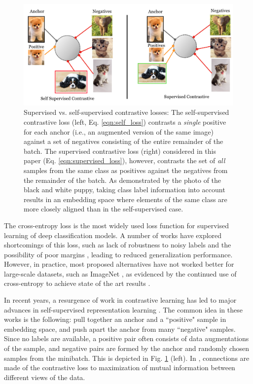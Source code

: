 \begin{figure}[t!]  
 \includegraphics[width=\linewidth]{./figs/teaser_fig_new1}
 {\caption{\small Supervised vs. self-supervised contrastive losses: The self-supervised contrastive loss (left, Eq. \ref{eqn:self_loss}) contrasts a \emph{single} positive for each anchor (i.e., an augmented version of the same image) against a set of negatives consisting of the entire remainder of the batch. The supervised contrastive loss (right) considered in this paper (Eq. \ref{eqn:supervised_loss}), however, contrasts the set of \emph{all} samples from the same class as positives against the negatives from the remainder of the batch. As demonstrated by the photo of the black and white puppy, taking class label information into account results in an embedding space where elements of the same class are more closely aligned than in the self-supervised case.}  
 \label{fig:teaser1}
}
 \vspace{-20pt}
\end{figure}

The cross-entropy loss is the most widely used loss function for supervised learning of deep classification models. A number of works have explored shortcomings of this loss, such as lack of robustness to noisy labels \cite{zhang2018generalized,sukhbaatar2014training} and the possibility of poor margins \cite{elsayed2018large,liu2016large}, leading to reduced generalization performance. However, in practice, most proposed alternatives have not worked better for large-scale datasets, such as ImageNet \cite{deng2009imagenet}, as evidenced by the continued use of cross-entropy to achieve state of the art results \cite{cubuk2019autoaugment,cubuk2019randaugment,xie2019self,kolesnikov2019large}. 


In recent years, a resurgence of work in contrastive learning has led to major advances in self-supervised representation learning \cite{wu2018unsupervised,henaff2019data,oord2018representation,tian2019contrastive,hjelm2018learning,chen2020simple,he2019momentum}. The common idea in these works is the following: pull together an anchor and a ``positive" sample in embedding space, and push apart the anchor from many ``negative" samples. Since no labels are available, a positive pair often consists of data augmentations of the sample, and negative pairs are formed by the anchor and randomly chosen samples from the minibatch. This is depicted in Fig. \ref{fig:teaser1} (left). In \cite{oord2018representation,tian2019contrastive}, connections are made of the contrastive loss to maximization of mutual information between different views of the data.


